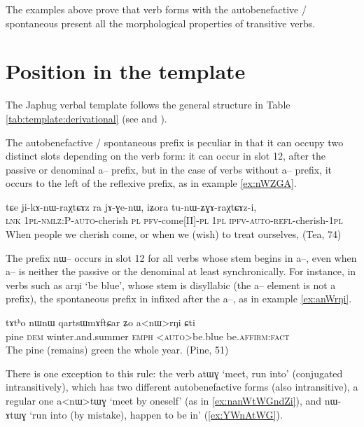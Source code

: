 \documentclass[oldfontcommands,oneside,a4paper,11pt]{article}
\newcommand{\ipa}[1]{{\phon \mbox{#1}}} %
\begin{document}
The examples above prove that verb forms with the autobenefactive / spontaneous present all the morphological  properties of transitive verbs.

\section{Position in the template}
The Japhug verbal template follows the general structure in Table \ref{tab:template:derivational} (see \citealt{jacques12incorp} and \citealt{jacques13harmonization}). 

The autobenefactive / spontaneous prefix is peculiar in that it can occupy two distinct slots depending on the verb form: it can occur  in slot 12, after the passive or denominal \ipa{a--} prefix, but in the case of verbs without \ipa{a--} prefix, it occurs to the left of the reflexive prefix, as in example \ref{ex:nWZGA}.

\begin{exe}
\ex \label{ex:nWZGA}
\gll 
\ipa{tɕe}  	\ipa{ji-kɤ-nɯ-raχtɕɤz}  	\ipa{ra}  	\ipa{jɤ-ɣe-nɯ,}  	\ipa{iʑora}  	\ipa{tu-nɯ-ʑɣɤ-raχtɕɤz-i,}  \\
\textsc{lnk} \textsc{1pl-nmlz:P-auto}-cherish \textsc{pl} \textsc{pfv}-come[II]-\textsc{pl} \textsc{1pl} \textsc{ipfv-auto-refl}-cherish-\textsc{1pl} \\
\glt When people we cherish come, or when we (wish) to treat ourselves, (Tea, 74)
\end{exe}

The prefix \ipa{nɯ--} occurs in slot 12 for all verbs whose stem begins in \ipa{a--}, even when   \ipa{a--} is neither the passive or the denominal at least synchronically. For instance, in verbs such as \ipa{arŋi} `be blue', whose stem is disyllabic (the \ipa{a--} element is not a prefix), the spontaneous prefix in infixed after the \ipa{a--}, as in  example \ref{ex:anWrŋi}.

\begin{exe}
\ex \label{ex:anWrŋi}
\gll 
\ipa{tɤtʰo}  	\ipa{nɯnɯ}  	\ipa{qartsɯmɤftɕar}  	\ipa{ʑo}  	\ipa{a<nɯ>rŋi}  	\ipa{ɕti}  \\
pine \textsc{dem} winter.and.summer \textsc{emph} <\textsc{auto}>be.blue be.\textsc{affirm:fact} \\
\glt The pine (remains) green the whole year. (Pine, 51)
\end{exe}
 
 
 There is one exception to this rule: the verb \ipa{atɯɣ} `meet, run into' (conjugated intransitively), which has two different autobenefactive forms (also intransitive), a regular one \ipa{a<nɯ>tɯɣ} `meet by oneself' (as in \ref{ex:nanWtWGndZi}), and  \ipa{nɯ-ɤtɯɣ}  `run into (by mistake), happen to be in'   (\ref{ex:YWnAtWG}).
 
\end{document}
